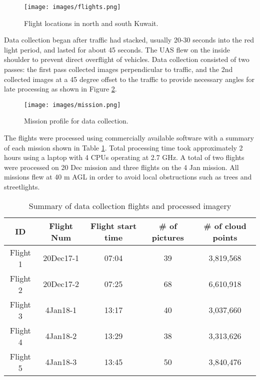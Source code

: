 \begin{figure}[H]
\centering
\texttt{[image: images/flights.png]} 
\caption[Flight locations]{Flight locations in north and south Kuwait.}
\label{fig:flights}
\end{figure}

Data collection began after traffic had stacked, usually 20-30 seconds into the red light period, and lasted for about 45 seconds. The UAS flew on the inside shoulder to prevent direct overflight of vehicles. Data collection consisted of two passes: the first pass collected images perpendicular to traffic, and the 2nd collected images at a 45 degree offset to the traffic to provide necessary angles for late processing as shown in Figure \ref{fig:mission}.

\begin{figure}[H]
\centering
\texttt{[image: images/mission.png]} 
\caption{Mission profile for data collection.}
\label{fig:mission}
\end{figure}

The flights were processed using commercially available software with a summary of each mission shown in Table \ref{tb:flightdata}. Total processing time took approximately 2 hours using a laptop with 4 CPUs operating at 2.7 GHz.  A total of two flights were processed on 20 Dec mission and three flights on the 4 Jan mission. All missions flew at 40 m AGL in order to avoid local obstructions such as trees and streetlights.

\begin{table}[H]
\centering
\caption{Summary of data collection flights and processed imagery}
\label{tb:flightdata}
\begin{tabular}{@{}ccccc@{}}
\toprule
\textbf{ID} & \textbf{Flight Num} &\textbf{Flight start time} & \textbf{\# of pictures} & \textbf{\# of cloud points} \\ \midrule
Flight 1 & 20Dec17-1 & 07:04 & 39 & 3,819,568 \\
Flight 2 &20Dec17-2 & 07:25 & 68 & 6,610,918 \\
Flight 3 &4Jan18-1 & 13:17 & 40 & 3,037,660 \\
Flight 4 &4Jan18-2 & 13:29 & 38 & 3,313,626 \\
Flight 5 &4Jan18-3 & 13:45 & 50 & 3,840,476 \\ \bottomrule
\end{tabular}
\end{table}


